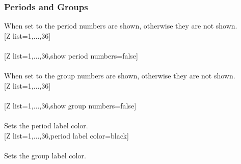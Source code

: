 \subsubsection{\texorpdfstring{ Periods and Groups}{Periods and Groups}}\vspace{6pt}%
\label{option_show period numbers}%
%
{When set to  the period numbers are shown, otherwise they are not shown.}%
\\ [5pt][Z list={1,...,36}]%
\\ [5pt]\makebox[\linewidth][c]{\scalebox{.6}{\pgfPT[Z list={1,...,36}]}}%
\\ [10pt][Z list={1,...,36},show period numbers=false]%
\\ [5pt]\makebox[\linewidth][c]{\scalebox{.6}{\pgfPT[Z list={1,...,36},show period numbers=false]}}%
\\ [5pt]\pgfPTendoption%
\label{option_show group numbers}%
%
{When set to  the group numbers are shown, otherwise they are not shown.}%
\\ [5pt][Z list={1,...,36}]%
\\ [10pt]\makebox[\linewidth][c]{\scalebox{.6}{\pgfPT[Z list={1,...,36}]}}%
\\ [10pt][Z list={1,...,36},show group numbers=false]%
\\ [10pt]\makebox[\linewidth][c]{\scalebox{.6}{\pgfPT[Z list={1,...,36},show group numbers=false]}}%
\\ [5pt]\pgfPTendoption%
\vfill%
\label{option_period label color}%
%
{Sets the period label color.}%
\\ [5pt][Z list={1,...,36},period label color=black]%
\\ [10pt]\makebox[\linewidth][c]{\scalebox{.6}{\pgfPT[Z list={1,...,36},period label color=black]}}%
\\ [5pt]\pgfPTendoption%
\vfill%
\label{option_group label color}%
%
{Sets the group label color.}%
\vfill%
\newpage%
